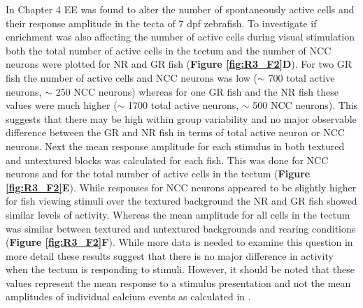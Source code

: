 In Chapter 4 EE was found to alter the number of spontaneously active cells and their response amplitude in the tecta of 7 dpf zebrafish. To investigate if enrichment was also affecting the number of active cells during visual stimulation both the total number of active cells in the tectum and the number of NCC neurons were plotted for NR and GR fish (\textbf{Figure \ref{fig:R3_F2}D}). For two GR fish the number of active cells and NCC neurons was low ($\sim$ 700 total active neurons, $\sim$ 250 NCC neurons) whereas for one GR fish and the NR fish these values were much higher ($\sim$ 1700 total active neurons, $\sim$ 500 NCC neurons). This suggests that there may be high within group variability and no major observable difference between the GR and NR fish in terms of total active neuron or NCC neurons. Next the mean response amplitude for each stimulus in both textured and untextured blocks was calculated for each fish. This was done for NCC neurons and for the total number of active cells in the tectum (\textbf{Figure \ref{fig:R3_F2}E}). While responses for NCC neurons appeared to be slightly higher for fish viewing stimuli over the textured background the NR and GR fish showed similar levels of activity. Whereas the mean amplitude for all cells in the tectum was similar between textured and untextured backgrounds and rearing conditions (\textbf{Figure \ref{fig:R3_F2}F}). While more data is needed to examine this question in more detail these results suggest that there is no major difference in activity when the tectum is responding to stimuli. However, it should be noted that these values represent the mean response to a stimulus presentation and not the mean amplitudes of individual calcium events as calculated in .

